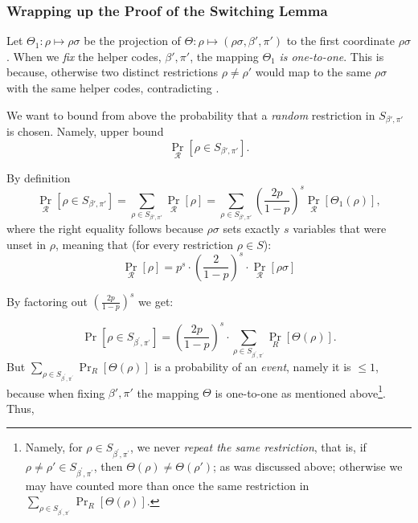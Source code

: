 \subsubsection{Wrapping up  the Proof of the Switching Lemma}


Let \( \Theta_1: \rho \mapsto \rho{\sigma} \) be the projection of \( \Theta: \rho \mapsto (\rho\sigma, \beta', \pi') \) to the first coordinate \(\rho{\sigma}\).
   When we \emph{fix} the helper codes, \(\beta', \pi'\), the mapping \( \Theta_1 \) \emph{is one-to-one}.
This is because, otherwise two distinct restrictions $\rho\neq\rho'$ would map to the same $\rho\sigma$ with the same helper codes, contradicting .
% 
% 
% 

We want to bound from above the probability that a \textit{random} restriction in \( S_{\beta', \pi'} \) is chosen.
Namely, upper bound
\[
\Pr_{\mathcal{R}} [\rho \in S_{\beta', \pi'}].
\]

By definition
\[
\Pr_{\mathcal{R}} [\rho \in S_{\beta', \pi'}] = \sum_{\rho \in S_{\beta', \pi'}} \Pr_{\mathcal{R}} [\rho] = \sum_{\rho \in S_{\beta', \pi'}} \left( \frac{2p}{1-p} \right)^s \Pr_{\mathcal{R}} [\Theta_1(\rho)],
\]
%
where the right equality follows  because  \( \rho\sigma \) sets exactly \( s \) variables that were unset in \( \rho \), meaning that (for every restriction $\rho\in S$):
\[
\Pr_{\mathcal{R}} [\rho ] = p^{s} \cdot \left( \frac{2}{1-p} \right)^s \cdot \Pr_{\mathcal{R}} [\rho\sigma]
\]

By factoring out \( \left( \frac{2p}{1 - p} \right)^s \) we get:

\[
\Pr \left[ \rho \in S_{\beta^{'},\pi^{'}} \right] = \left( \frac{2p}{1 - p} \right)^s \cdot \sum_{\rho \in S_{\beta^{'},\pi^{'}}} \Pr_R [\Theta(\rho)].
\]
But \( \sum_{\rho \in S_{\beta^{'},\pi^{'}}} \Pr_R [\Theta(\rho)] \) is a probability of an \emph{event}, namely it is \( \leq 1 \), because when fixing $\beta',\pi'$ the mapping $\Theta$ is one-to-one as mentioned above\footnote{Namely,  for \( \rho \in S_{\beta^{'},\pi^{'}} \), we never \emph{repeat the same restriction}, that is, if \( \rho \neq \rho' \in S_{\beta^{'},\pi^{'}} \), then \( \Theta(\rho) \neq \Theta(\rho') \); as was discussed above; otherwise we may have counted more than once the same restriction in \( \sum_{\rho \in S_{\beta^{'},\pi^{'}}} \Pr_R [\Theta(\rho)] \).}.
Thus,

